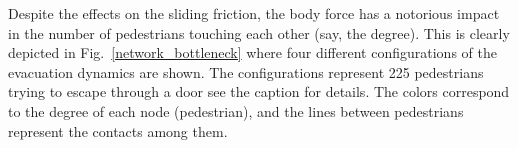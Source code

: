 \documentclass[preprint,12pt]{elsarticle}
\begin{document}
Despite the effects on the sliding friction, the body force 
has a notorious impact in the number of pedestrians touching each other (say, 
the degree). This is clearly depicted in Fig.~\ref{network_bottleneck} where 
four different configurations of the evacuation dynamics are shown. The 
configurations represent 225 pedestrians trying to escape through a door see the 
caption for details. The colors correspond to the degree of each node 
(pedestrian), and the lines between pedestrians represent the contacts among 
them.\\



\begin{figure}[!htbp]
\centering
    \ 
    \\
        \ 

\end{figure}
\end{document}
